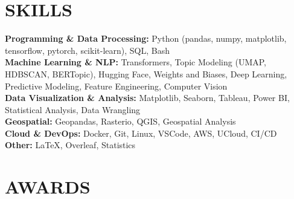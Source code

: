 \documentclass{resume}
\begin{document}
\section{SKILLS} 
\begin{content}
    {\bf Programming \& Data Processing:} Python {\footnotesize (pandas, numpy, matplotlib, tensorflow, pytorch, scikit-learn)}, SQL, Bash \\
    {\bf Machine Learning \& NLP:} Transformers, Topic Modeling {\footnotesize (UMAP, HDBSCAN, BERTopic)}, Hugging Face, Weights and Biases, Deep Learning, Predictive Modeling, Feature Engineering, Computer Vision \\
    {\bf Data Visualization \& Analysis:} Matplotlib, Seaborn, Tableau, Power BI, Statistical Analysis, Data Wrangling \\
    {\bf Geospatial:} Geopandas, Rasterio, QGIS, Geospatial Analysis \\
    {\bf Cloud \& DevOps:} Docker, Git, Linux, VSCode, AWS, UCloud, CI/CD \\
    {\bf Other:} \LaTeX, Overleaf, Statistics \\
\end{content}


\section{AWARDS}
\begin{content}
     \\
     \\
\end{content}

\end{document}
